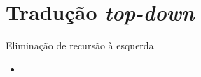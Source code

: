 \section{Tradução {\it top-down}}

\begin{frame}[fragile]{Eliminação de recursão à esquerda}

    \begin{itemize}
        \item 
    \end{itemize}

\end{frame}
